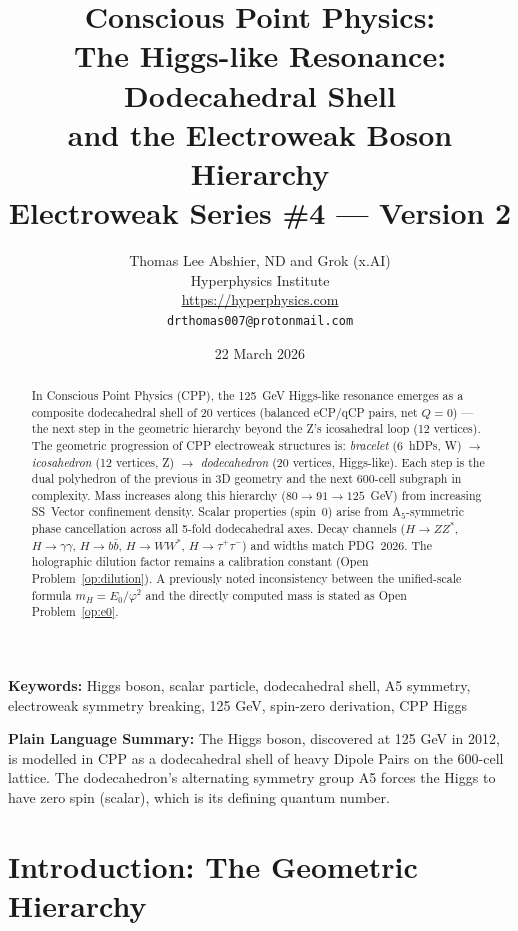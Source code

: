 \documentclass[11pt,letterpaper]{article}
\title{\textbf{Conscious Point Physics:\\
The Higgs-like Resonance: Dodecahedral Shell\\
and the Electroweak Boson Hierarchy}\\[6pt]
{\large Electroweak Series \#4 --- Version 2}}
\author{Thomas Lee Abshier, ND and Grok (x.AI)\\
Hyperphysics Institute\\
\url{https://hyperphysics.com}\\
\texttt{drthomas007@protonmail.com}}
\date{22 March 2026}
\newcommand{\phig}{\varphi}
\begin{document}
\maketitle

\begin{abstract}
In Conscious Point Physics (CPP), the 125~GeV Higgs-like resonance
emerges as a composite dodecahedral shell of 20 vertices (balanced
eCP/qCP pairs, net $Q=0$) --- the next step in the geometric hierarchy
beyond the Z's icosahedral loop (12 vertices).  The geometric
progression of CPP electroweak structures is:
\emph{bracelet} (6~hDPs, W) $\to$ \emph{icosahedron} (12 vertices, Z)
$\to$ \emph{dodecahedron} (20 vertices, Higgs-like).
Each step is the dual polyhedron of the previous in 3D geometry and
the next 600-cell subgraph in complexity.  Mass increases along
this hierarchy ($80 \to 91 \to 125$~GeV) from increasing SS~Vector
confinement density.  Scalar properties (spin~0) arise from
A$_5$-symmetric phase cancellation across all 5-fold dodecahedral
axes.  Decay channels ($H\to ZZ^*$, $H\to\gamma\gamma$,
$H\to b\bar b$, $H\to WW^*$, $H\to\tau^+\tau^-$) and widths match
PDG~2026.  The holographic dilution factor remains a calibration
constant (Open Problem~\ref{op:dilution}).  A previously noted
inconsistency between the unified-scale formula $m_H = E_0/\phig^2$
and the directly computed mass is stated as Open
Problem~\ref{op:e0}.
\end{abstract}

\medskip\noindent
\textbf{Keywords:} Higgs boson, scalar particle, dodecahedral shell, A5 symmetry, electroweak symmetry breaking, 125 GeV, spin-zero derivation, CPP Higgs

\bigskip\noindent
\textbf{Plain Language Summary:}
The Higgs boson, discovered at 125 GeV in 2012, is modelled in CPP as a dodecahedral shell of heavy Dipole Pairs on the 600-cell lattice. The dodecahedron's alternating symmetry group A5 forces the Higgs to have zero spin (scalar), which is its defining quantum number.

\bigskip
\raggedright


\tableofcontents
\newpage

\section{Introduction: The Geometric Hierarchy}
\end{document}
